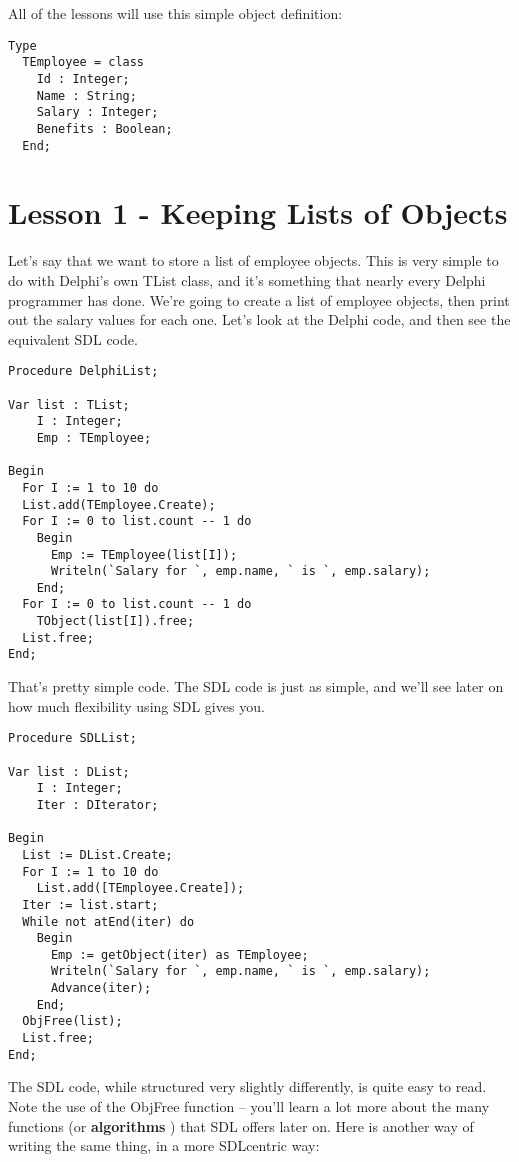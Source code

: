 \documentclass{report}
\begin{document}
All of the lessons will use this simple object definition:

\begin{lstlisting}
Type
  TEmployee = class
    Id : Integer;
    Name : String;
    Salary : Integer;
    Benefits : Boolean;
  End;
\end{lstlisting}

\section{Lesson 1 - Keeping Lists of Objects}

Let's say that we want to store a list of employee objects.  This is very
simple to do with Delphi's own TList class, and it's something that nearly
every Delphi programmer has done. We're going to create a list of employee
objects, then print out the salary values for each one. Let's look at the
Delphi code, and then see the equivalent SDL code.

\begin{lstlisting}
Procedure DelphiList;

Var list : TList;
    I : Integer;
    Emp : TEmployee;

Begin
  For I := 1 to 10 do
  List.add(TEmployee.Create);
  For I := 0 to list.count -- 1 do
    Begin
      Emp := TEmployee(list[I]);
      Writeln(`Salary for `, emp.name, ` is `, emp.salary);
    End;
  For I := 0 to list.count -- 1 do
    TObject(list[I]).free;
  List.free;
End;
\end{lstlisting}

That's pretty simple code. The SDL code is just as simple, 
and we'll see later on how much flexibility using SDL gives you.

\begin{lstlisting}
Procedure SDLList;

Var list : DList;
    I : Integer;
    Iter : DIterator;

Begin
  List := DList.Create;
  For I := 1 to 10 do
    List.add([TEmployee.Create]);
  Iter := list.start;
  While not atEnd(iter) do
    Begin
      Emp := getObject(iter) as TEmployee;
      Writeln(`Salary for `, emp.name, ` is `, emp.salary);
      Advance(iter);
    End;
  ObjFree(list);
  List.free;
End;
\end{lstlisting}

The SDL code, while structured very slightly differently, 
is quite easy to read. Note the use
of the ObjFree function -- you'll learn a lot more about 
the many functions (or \textbf{algorithms} )
that SDL offers later on. Here is another way of writing the 
same thing, in a more SDLcentric way:
\end{document}

